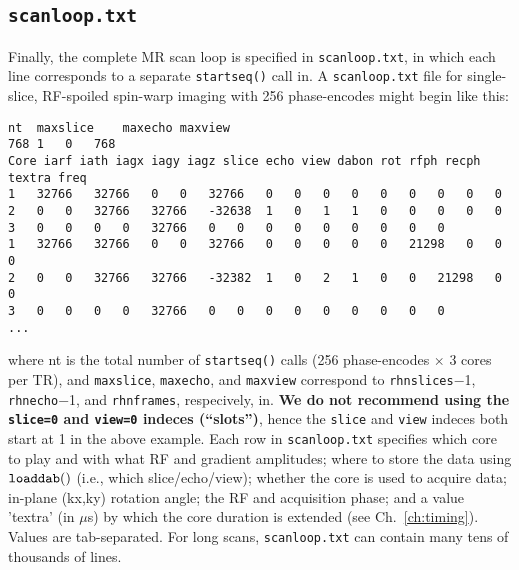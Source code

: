 \subsection{\tt scanloop.txt}
Finally, the complete MR scan loop is specified in {\tt scanloop.txt}, in which each line corresponds to a separate {\tt startseq()} call in\toppe.
A {\tt scanloop.txt} file for single-slice, RF-spoiled spin-warp imaging with 256 phase-encodes might begin like this:
\begin{lstlisting}
nt	maxslice	maxecho	maxview
768	1	0	768	
Core iarf iath iagx iagy iagz slice echo view dabon rot rfph recph textra freq
1	32766	32766	0	0	32766	0	0	0	0	0	0	0	0	0
2	0	0	32766	32766	-32638	1	0	1	1	0	0	0	0	0
3	0	0	0	0	32766	0	0	0	0	0	0	0	0	0
1	32766	32766	0	0	32766	0	0	0	0	0	21298	0	0	0
2	0	0	32766	32766	-32382	1	0	2	1	0	0	21298	0	0
3	0	0	0	0	32766	0	0	0	0	0	0	0	0	0
...
\end{lstlisting}
where nt is the total number of {\tt startseq()} calls (256 phase-encodes $\times$ 3 cores per TR), and \texttt{maxslice}, \texttt{maxecho}, and \texttt{maxview} correspond to \texttt{rhnslices}$-$1, \texttt{rhnecho}$-$1, and \texttt{rhnframes}, respecively, in\toppe.
\textbf{We do not recommend using the {\tt slice=0} and {\tt view=0} indeces (``slots'')}, hence the {\tt slice} and {\tt view} indeces both start at 1 in the above example.
Each row in {\tt scanloop.txt} specifies which core to play and with what RF and gradient amplitudes; where to store the data using $\tt loaddab()$ (i.e., which slice/echo/view); whether the core is used to acquire data; in-plane (kx,ky) rotation angle; the RF and acquisition phase; and a value 'textra' (in $\mu$s) by which the core duration is extended (see Ch.~\ref{ch:timing}).
Values are tab-separated.
For long scans, {\tt scanloop.txt} can contain many tens of thousands of lines.




